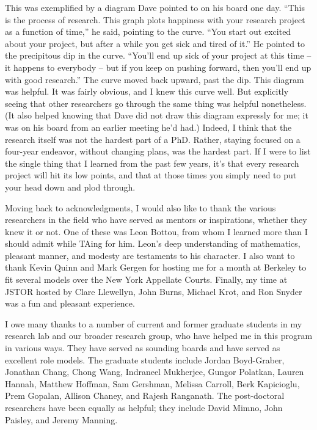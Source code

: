 This was exemplified by a diagram Dave pointed to on his board one
day.  ``This is the process of research.  This graph plots happiness
with your research project as a function of time,'' he said, pointing
to the curve.  ``You start out excited about your project, but after a
while you get sick and tired of it.''  He pointed to the precipitous
dip in the curve.  ``You'll end up sick of your project at this time
-- it happens to everybody -- but if you keep on pushing forward, then
you'll end up with good research.''  The curve moved back upward, past
the dip.  This diagram was helpful.  It was fairly obvious, and I knew
this curve well.  But explicitly seeing that other researchers go
through the same thing was helpful nonetheless.  (It also helped
knowing that Dave did not draw this diagram expressly for me; it was
on his board from an earlier meeting he'd had.)  Indeed, I think that
the research itself was not the hardest part of a PhD.  Rather,
staying focused on a four-year endeavor, without changing plans, was
the hardest part. If I were to list the single thing that I learned
from the past few years, it's that every research project will hit its
low points, and that at those times you simply need to put your head
down and plod through.

Moving back to acknowledgments, I would also like to thank the various
researchers in the field who have served as mentors or inspirations,
whether they knew it or not.  One of these was Leon Bottou, from whom
I learned more than I should admit while TAing for him. Leon's deep
understanding of mathematics, pleasant manner, and modesty are
testaments to his character.  I also want to thank Kevin Quinn and
Mark Gergen for hosting me for a month at Berkeley to fit several
models over the New York Appellate Courts.  Finally, my time at JSTOR
hosted by Clare Llewellyn, John Burns, Michael Krot, and Ron Snyder
was a fun and pleasant experience.

I owe many thanks to a number of current and former graduate students
in my research lab and our broader research group, who have helped me
in this program in various ways.  They have served as sounding boards
and have served as excellent role models.  The graduate students
include Jordan Boyd-Graber, Jonathan Chang, Chong Wang, Indraneel
Mukherjee, Gungor Polatkan, Lauren Hannah, Matthew Hoffman, Sam
Gershman, Melissa Carroll, Berk Kapicioglu, Prem Gopalan, Allison
Chaney, and Rajesh Ranganath.  The post-doctoral researchers have been
equally as helpful; they include David Mimno, John Paisley, and Jeremy
Manning.

